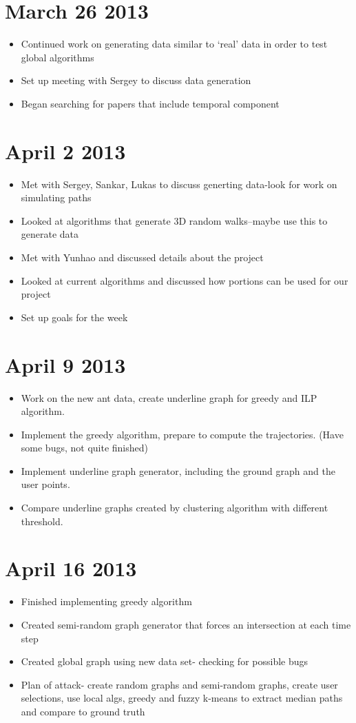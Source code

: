 \documentclass[12pt]{article}
\begin{document}
\section{March 26 2013}
\begin{itemize}
\item Continued work on generating data similar to `real' data in order to test global algorithms
\item Set up meeting with Sergey to discuss data generation
\item Began searching for papers that include temporal component
\end{itemize}

\section{April 2 2013}
\begin{itemize}
\item Met with Sergey, Sankar, Lukas to discuss generting data-look for work on simulating paths
\item Looked at algorithms that generate 3D random walks--maybe use this to generate data
\item Met with Yunhao and discussed details about the project
\item Looked at current algorithms and discussed how portions can be used for our project
\item Set up goals for the week
\end{itemize}

\section{April 9 2013}
\begin{itemize}
\item	Work on the new ant data, create underline graph for greedy and ILP algorithm.
\item	Implement the greedy algorithm, prepare to compute the trajectories. (Have some bugs, not quite finished)
\item	Implement underline graph generator, including the ground graph and the user points.
\item	Compare underline graphs created by clustering algorithm with different threshold.
\end{itemize}

\section{April 16 2013}
\begin{itemize}
\item Finished implementing greedy algorithm
\item Created semi-random graph generator that forces an intersection at each time step
\item Created global graph using new data set- checking for possible bugs
\item Plan of attack- create random graphs and semi-random graphs, create user selections, use local algs, greedy and fuzzy k-means to extract median paths and compare to ground truth
\end{itemize}
\end{document}
